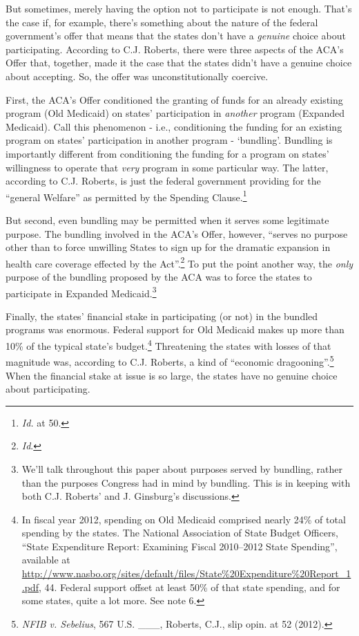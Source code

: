 \documentclass[
  10pt,
  letterpaper,
  DIV=11,
  numbers=noendperiod,
  twoside]{scrartcl}
\begin{document}
But sometimes, merely having the option not to participate is not
enough. That's the case if, for example, there's something about the
nature of the federal government's offer that means that the states
don't have a \emph{genuine} choice about participating. According to
C.J. Roberts, there were three aspects of the ACA's Offer that,
together, made it the case that the states didn't have a genuine choice
about accepting. So, the offer was unconstitutionally coercive.

First, the ACA's Offer conditioned the granting of funds for an already
existing program (Old Medicaid) on states' participation in
\emph{another} program (Expanded Medicaid). Call this phenomenon - i.e.,
conditioning the funding for an existing program on states'
participation in another program - `bundling'. Bundling is importantly
different from conditioning the funding for a program on states'
willingness to operate that \emph{very} program in some particular way.
The latter, according to C.J. Roberts, is just the federal government
providing for the ``general Welfare'' as permitted by the Spending
Clause.\footnote{\emph{Id.} at 50.}

But second, even bundling may be permitted when it serves some
legitimate purpose. The bundling involved in the ACA's Offer, however,
``serves no purpose other than to force unwilling States to sign up for
the dramatic expansion in health care coverage effected by the
Act''.\footnote{\emph{Id}.} To put the point another way, the
\emph{only} purpose of the bundling proposed by the ACA was to force the
states to participate in Expanded Medicaid.\footnote{We'll talk
  throughout this paper about purposes served by bundling, rather than
  the purposes Congress had in mind by bundling. This is in keeping with
  both C.J. Roberts' and J. Ginsburg's discussions.}

Finally, the states' financial stake in participating (or not) in the
bundled programs was enormous. Federal support for Old Medicaid makes up
more than 10\% of the typical state's budget.\footnote{In fiscal year
  2012, spending on Old Medicaid comprised nearly 24\% of total spending
  by the states. The National Association of State Budget Officers,
  ``State Expenditure Report: Examining Fiscal 2010--2012 State
  Spending'', available at
  \url{http://www.nasbo.org/sites/default/files/State\%20Expenditure\%20Report_1.pdf},
  44. Federal support offset at least 50\% of that state spending, and
  for some states, quite a lot more. See note 6.} Threatening the states
with losses of that magnitude was, according to C.J. Roberts, a kind of
``economic dragooning''.\footnote{\emph{NFIB v. Sebelius}, 567 U.S.
  \_\_\_, Roberts, C.J., slip opin. at 52 (2012).} When the financial
stake at issue is so large, the states have no genuine choice about
participating.
\end{document}
